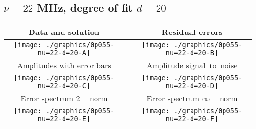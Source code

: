 

% 

\clearpage{}
\break{}

\subsection{$\nu = 22$ MHz, degree of fit $d = 20$}

\begin{table}[h]
    \begin{center}
        \begin{tabular}{ccc}
            Data and solution & \quad & Residual errors \\\hline
            \texttt{[image: ./graphics/0p055-nu=22-d=20-A]} &&
            \texttt{[image: ./graphics/0p055-nu=22-d=20-B]} \\[15pt]
            Amplitudes with error bars && Amplitude signal--to--noise \\\hline
            \texttt{[image: ./graphics/0p055-nu=22-d=20-C]} &&
            \texttt{[image: ./graphics/0p055-nu=22-d=20-D]} \\[15pt]
            Error spectrum $2-$norm && Error spectrum $\infty-$norm \\\hline
            \texttt{[image: ./graphics/0p055-nu=22-d=20-E]} &&
            \texttt{[image: ./graphics/0p055-nu=22-d=20-F]} \\[15pt]
        \end{tabular}
    \end{center}
\label{fig:elev=55, nu=22}
\end{table}



\endinput
